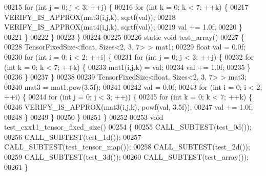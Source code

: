 \begin{DoxyCode}
00215     \textcolor{keywordflow}{for} (\textcolor{keywordtype}{int} j = 0; j < 3; ++j) \{
00216       \textcolor{keywordflow}{for} (\textcolor{keywordtype}{int} k = 0; k < 7; ++k) \{
00217         VERIFY\_IS\_APPROX(mat3(i,j,k), sqrtf(val));
00218         VERIFY\_IS\_APPROX(mat4(i,j,k), sqrtf(val));
00219         val += 1.0f;
00220       \}
00221     \}
00222   \}
00223 \}
00224 
00225 
00226 \textcolor{keyword}{static} \textcolor{keywordtype}{void} test\_array()
00227 \{
00228   TensorFixedSize<float, Sizes<2, 3, 7> > mat1;
00229   \textcolor{keywordtype}{float} val = 0.0f;
00230   \textcolor{keywordflow}{for} (\textcolor{keywordtype}{int} i = 0; i < 2; ++i) \{
00231     \textcolor{keywordflow}{for} (\textcolor{keywordtype}{int} j = 0; j < 3; ++j) \{
00232       \textcolor{keywordflow}{for} (\textcolor{keywordtype}{int} k = 0; k < 7; ++k) \{
00233         mat1(i,j,k) = val;
00234         val += 1.0f;
00235       \}
00236     \}
00237   \}
00238 
00239   TensorFixedSize<float, Sizes<2, 3, 7> > mat3;
00240   mat3 = mat1.pow(3.5f);
00241 
00242   val = 0.0f;
00243   \textcolor{keywordflow}{for} (\textcolor{keywordtype}{int} i = 0; i < 2; ++i) \{
00244     \textcolor{keywordflow}{for} (\textcolor{keywordtype}{int} j = 0; j < 3; ++j) \{
00245       \textcolor{keywordflow}{for} (\textcolor{keywordtype}{int} k = 0; k < 7; ++k) \{
00246         VERIFY\_IS\_APPROX(mat3(i,j,k), powf(val, 3.5f));
00247         val += 1.0f;
00248       \}
00249     \}
00250   \}
00251 \}
00252 
00253 \textcolor{keywordtype}{void} test\_cxx11\_tensor\_fixed\_size()
00254 \{
00255   CALL\_SUBTEST(test\_0d());
00256   CALL\_SUBTEST(test\_1d());
00257   CALL\_SUBTEST(test\_tensor\_map());
00258   CALL\_SUBTEST(test\_2d());
00259   CALL\_SUBTEST(test\_3d());
00260   CALL\_SUBTEST(test\_array());
00261 \}
\end{DoxyCode}
